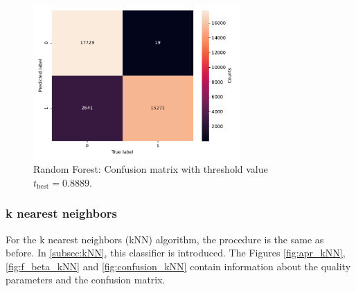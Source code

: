 \begin{figure}
    \centering
    \includegraphics[width=0.7\textwidth]{content/plots/confusion_rdm.pdf}
    \caption{Random Forest: Confusion matrix with threshold value $t_{\mathrm{best}} = \num{0.8889}$.}
    \label{fig:confusion_rdm}
\end{figure}

\subsubsection{k nearest neighbors}
For the k nearest neighbors (kNN) algorithm, the procedure is the same as before. In \autoref{subsec:kNN}, this classifier is introduced.
The Figures \ref{fig:apr_kNN}, \ref{fig:f_beta_kNN} and \ref{fig:confusion_kNN} contain information about the quality parameters and the confusion 
matrix.

